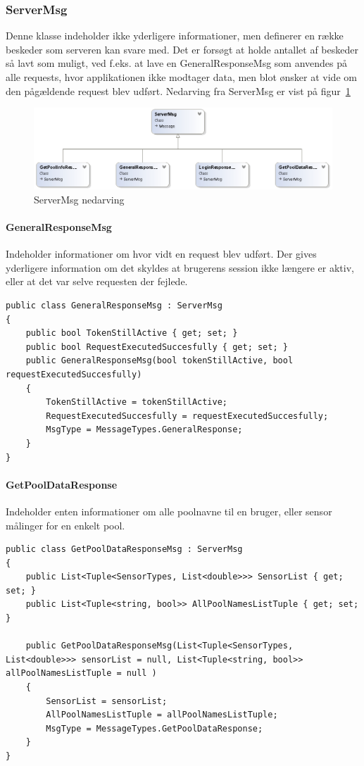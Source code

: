\subsubsection{ServerMsg}
Denne klasse indeholder ikke yderligere informationer, men definerer en række beskeder som serveren kan svare med. Det er forsøgt at holde antallet af beskeder så lavt som muligt, ved f.eks. at lave en GeneralResponseMsg som anvendes på alle requests, hvor applikationen ikke modtager data, men blot ønsker at vide om den pågældende request blev udført. Nedarving fra ServerMsg er vist på figur~\ref{fig:ServerMsgUML}
\begin{figure}
	\centering
	\includegraphics[width=0.9\linewidth]{figs/connection/ServerMsgUML.png}
	\caption{ServerMsg nedarving}
	\label{fig:ServerMsgUML}
\end{figure}

\paragraph{GeneralResponseMsg}
Indeholder informationer om hvor vidt en request blev udført. Der gives yderligere information om det skyldes at brugerens session ikke længere er aktiv, eller at det var selve requesten der fejlede.
\begin{lstlisting}[caption=GeneralResponseMsg, label=code:GeneralResponseMsg]
public class GeneralResponseMsg : ServerMsg
{
	public bool TokenStillActive { get; set; }
	public bool RequestExecutedSuccesfully { get; set; }
	public GeneralResponseMsg(bool tokenStillActive, bool requestExecutedSuccesfully)
	{
		TokenStillActive = tokenStillActive;
		RequestExecutedSuccesfully = requestExecutedSuccesfully;
		MsgType = MessageTypes.GeneralResponse;
	}
}
\end{lstlisting}

\paragraph{GetPoolDataResponse}
Indeholder enten informationer om alle poolnavne til en bruger, eller sensor målinger for en enkelt pool.
\begin{lstlisting}[caption=GetPoolDataResponse, label=code:GetPoolDataResponse]
public class GetPoolDataResponseMsg : ServerMsg
{
	public List<Tuple<SensorTypes, List<double>>> SensorList { get; set; }
	public List<Tuple<string, bool>> AllPoolNamesListTuple { get; set; }
	
	public GetPoolDataResponseMsg(List<Tuple<SensorTypes, List<double>>> sensorList = null, List<Tuple<string, bool>> allPoolNamesListTuple = null )
	{
		SensorList = sensorList;
		AllPoolNamesListTuple = allPoolNamesListTuple;
		MsgType = MessageTypes.GetPoolDataResponse;
	}
}
\end{lstlisting}

